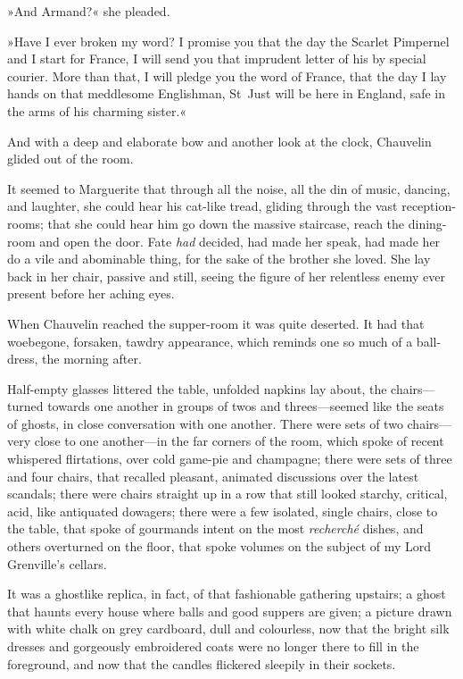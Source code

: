 »And Armand?« she pleaded.

»Have I ever broken my word? I promise you that the day the Scarlet Pimpernel and I start for France, I will send you that imprudent letter of his by special courier. More than that, I will pledge you the word of France, that the day I lay hands on that meddlesome Englishman, St~Just will be here in England, safe in the arms of his charming sister.«

And with a deep and elaborate bow and another look at the clock, Chauvelin glided out of the room.

It seemed to Marguerite that through all the noise, all the din of music, dancing, and laughter, she could hear his cat-like tread, gliding through the vast reception-rooms; that she could hear him go down the massive staircase, reach the dining-room and open the door. Fate \textit{had} decided, had made her speak, had made her do a vile and abominable thing, for the sake of the brother she loved. She lay back in her chair, passive and still, seeing the figure of her relentless enemy ever present before her aching eyes.

When Chauvelin reached the supper-room it was quite deserted. It had that woebegone, forsaken, tawdry appearance, which reminds one so much of a ball-dress, the morning after.

Half-empty glasses littered the table, unfolded napkins lay about, the chairs—turned towards one another in groups of twos and threes—seemed like the seats of ghosts, in close conversation with one another. There were sets of two chairs—very close to one another—in the far corners of the room, which spoke of recent whispered flirtations, over cold game-pie and champagne; there were sets of three and four chairs, that recalled pleasant, animated discussions over the latest scandals; there were chairs straight up in a row that still looked starchy, critical, acid, like antiquated dowagers; there were a few isolated, single chairs, close to the table, that spoke of gourmands intent on the most \textit{recherché} dishes, and others overturned on the floor, that spoke volumes on the subject of my Lord Grenville's cellars.

It was a ghostlike replica, in fact, of that fashionable gathering upstairs; a ghost that haunts every house where balls and good suppers are given; a picture drawn with white chalk on grey cardboard, dull and colourless, now that the bright silk dresses and gorgeously embroidered coats were no longer there to fill in the foreground, and now that the candles flickered sleepily in their sockets.

